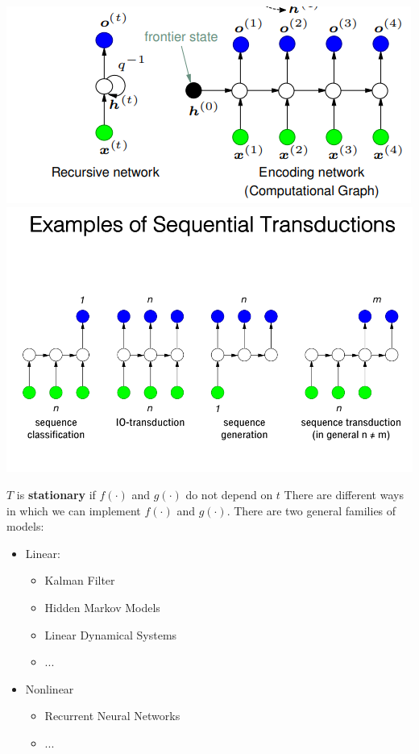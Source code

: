 \begin{center}
    \includegraphics[]{images/encoding-network.png}
    \includegraphics[scale=0.7]{images/sequential--transduction.png}
\end{center}
$T$ is \textbf{stationary} if $f(\cdot)$ and $g(\cdot)$ do not depend on $t$\newline\newline
There are different ways in which we can implement $f(\cdot)$ and $g(\cdot)$. There are two general families of models:
\begin{itemize}
    \item Linear:
    \begin{itemize}
        \item Kalman Filter
        \item Hidden Markov Models
        \item Linear Dynamical Systems
        \item ...
    \end{itemize}
    \item Nonlinear
    \begin{itemize}
        \item Recurrent Neural Networks
        \item ...
    \end{itemize}
\end{itemize}

